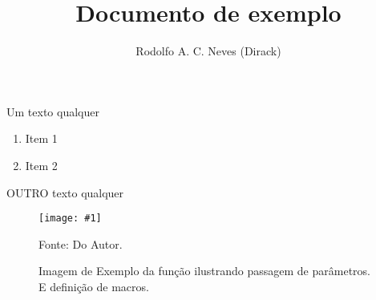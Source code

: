 \documentclass[a4paper,11pt]{article}
\author{Rodolfo A. C. Neves (Dirack)}
\title{Documento de exemplo}
\begin{document}
\newcommand{\printTexto}
{
  Um texto qualquer
}

\printTexto


\newcommand{\be}{\begin{enumerate}}
\newcommand{\ee}{\end{enumerate}}
 
\be
  \item Item 1
  \item Item 2
\ee


\renewcommand{\printTexto}
{
  OUTRO texto qualquer
}
 
\printTexto


\newcommand{\imagex}[5]
 {

   	\begin{figure}[htb]
   	\caption{#2}
  	\begin{center}
   	\texttt{[image: \#1]}
   	\vspace{-0.3cm}
   	\end{center}
   	\begin{center}
   	 Fonte: #4
   	\end{center}
   	\label{#3}
   	\end{figure}
}

\imagex{images/test.jpg}{Imagem de Exemplo da função ilustrando passagem de parâmetros. 
E definição de macros.}{fig:1}{Do Autor.}{0.5}
\end{document}
